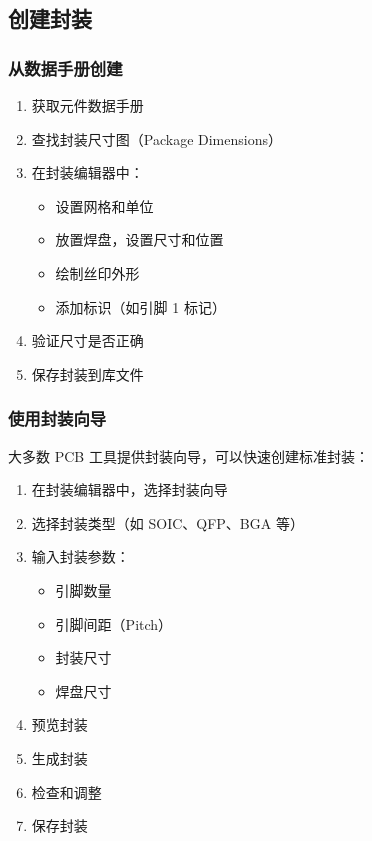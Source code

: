 \subsection{创建封装}

\subsubsection{从数据手册创建}


\begin{enumerate}
  \item 获取元件数据手册
  \item 查找封装尺寸图（Package Dimensions）
  \item 在封装编辑器中：
    \begin{itemize}
      \item 设置网格和单位
      \item 放置焊盘，设置尺寸和位置
      \item 绘制丝印外形
      \item 添加标识（如引脚 1 标记）
    \end{itemize}
  \item 验证尺寸是否正确
  \item 保存封装到库文件
\end{enumerate}

\subsubsection{使用封装向导}

大多数 PCB 工具提供封装向导，可以快速创建标准封装：


\begin{enumerate}
  \item 在封装编辑器中，选择封装向导
  \item 选择封装类型（如 SOIC、QFP、BGA 等）
  \item 输入封装参数：
    \begin{itemize}
      \item 引脚数量
      \item 引脚间距（Pitch）
      \item 封装尺寸
      \item 焊盘尺寸
    \end{itemize}
  \item 预览封装
  \item 生成封装
  \item 检查和调整
  \item 保存封装
\end{enumerate}

